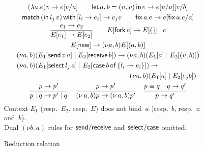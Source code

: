\begin{figure}[t]
  \begin{gather*}
    (\lambda a.e)v \reduces e\subs va
    \qquad
    \letin{a,b}{(u,v)}{e} \reduces e\subs ua\subs vb
    \\
    \match{(\ink\,l_j\,v)}{l_i\rightarrow e_i}  \reduces e_jv
    \qquad
    \fix ae \reduces e \subs{\fix ae}{a}
    \\
    \frac{e_1 \reduces e_2}{E[e_1] \reduces E[e_2]}
    \qquad
    E[\fork e] \reduces E[()] \PAR e
    \\
    E[\newk] \reduces (\nu a,b)E[(a,b)]
    \\ %
    (\nu a,b)(E_1[\send va] \PAR E_2[\recv b])
    \reduces
    (\nu a,b)(E_1[a] \PAR E_2[(v,b)])
    \\
    (\nu a,b)(E_1[\selectk\,l_j\,a] \PAR E_2[\casek\,b\,\ofk\,\{l_i\rightarrow e_i\}])
    \reduces  \qquad \qquad  \qquad\\
    \qquad \qquad \qquad \qquad \qquad \qquad \qquad \qquad (\nu a,b)(E_1[a] \PAR E_2[e_jb])
    \\
    \frac{p \reduces p'}{p\PAR q \reduces p'\PAR q}
    \quad
    \frac{p \reduces p'}{(\new a,b)p \reduces (\new a,b)p'}
    \quad
    \frac{p \equiv q\quad q \reduces q'}{p \reduces q'}
  \end{gather*}
  Context $E_1$ (resp.~$E_2$, resp.~$E$) does not bind~$a$ (resp.~$b$,
  resp.~$a$ and~$b$).
  \\
  Dual $(\nu b,a)$ rules for $\mathsf{send}/\mathsf{receive}$ and $\mathsf{select}/\mathsf{case}$
  omitted.
  \caption{Reduction relation}
  \label{fig:reduction}
\end{figure}

